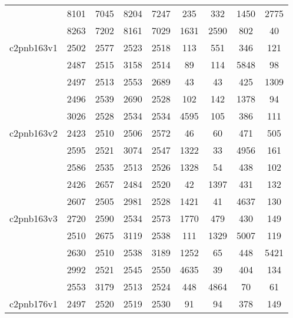 \documentclass[a4paper, 8pt, envcountsect, runningheads]{article}
\begin{document}
\begin{center}
\begin{longtable}{ |l|c|c|c|c|c|c|c|c| }
	 & 8101 & 7045 & 8204 & 7247 & 235 & 332 & 1450 & 2775 \\
	 
	 & 8263 & 7202 & 8161 & 7029 & 1631 & 2590 & 802 & 40 \\ \hline
	 
	 c2pnb163v1 & 2502 & 2577 & 2523 & 2518 & 113 & 551 & 346 & 121 \\
	 
	 & 2487 & 2515 & 3158 & 2514 & 89 & 114 & 5848 & 98 \\
	 	 
	 & 2497 & 2513 & 2553 & 2689 & 43 & 43 & 425 & 1309 \\
	 
	 & 2496 & 2539 & 2690 & 2528 & 102 & 142 & 1378 & 94 \\
	 
	 & 3026 & 2528 & 2534 & 2534 & 4595 & 105 & 386 & 111 \\ \hline
	 	 
	 c2pnb163v2 & 2423 & 2510 & 2506 & 2572 & 46 & 60 & 471 & 505 \\
	 
	 & 2595 & 2521 & 3074 & 2547 & 1322 & 33 & 4956 & 161 \\
	 	 
	 & 2586 & 2535 & 2513 & 2526 & 1328 & 54 & 438 & 102 \\
	 
	 & 2426 & 2657 & 2484 & 2520 & 42 & 1397 & 431 & 132 \\
	 
	 & 2607 & 2505 & 2981 & 2528 & 1421 & 41 & 4637 & 130 \\ \hline
	 	 
	 c2pnb163v3 & 2720 & 2590 & 2534 & 2573 & 1770 & 479 & 430 & 149 \\
	 
	 & 2510 & 2675 & 3119 & 2538 & 111 & 1329 & 5007 & 119 \\
	 	 
	 & 2630 & 2510 & 2538 & 3189 & 1252 & 65 & 448 & 5421 \\
	 
	 & 2992 & 2521 & 2545 & 2550 & 4635 & 39 & 404 & 134 \\
	 
	 & 2553 & 3179 & 2513 & 2524 & 448 & 4864 & 70 & 61 \\ \hline
	 	 
	 c2pnb176v1 & 2497 & 2520 & 2519 & 2530 & 91 & 94 & 378 & 149 \\
	 

\end{longtable}
\end{center}
\end{document}
